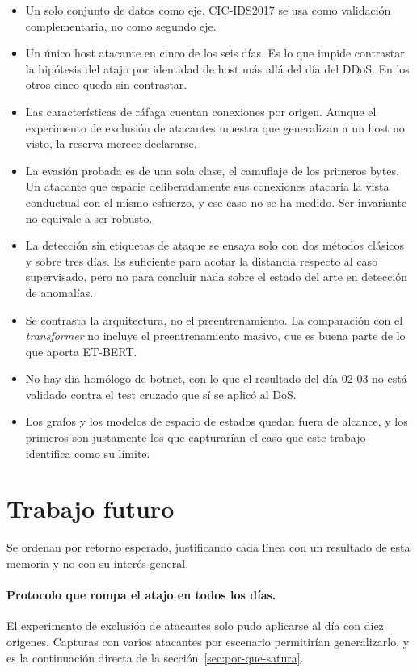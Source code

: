 \begin{itemize}
  \item Un solo conjunto de datos como eje. CIC-IDS2017 se usa como validación
        complementaria, no como segundo eje.
  \item Un único host atacante en cinco de los seis días. Es lo que impide
        contrastar la hipótesis del atajo por identidad de host más allá del día
        del DDoS. En los otros cinco queda sin contrastar.
  \item Las características de ráfaga cuentan conexiones por origen. Aunque el
        experimento de exclusión de atacantes muestra que generalizan a un host
        no visto, la reserva merece declararse.
  \item La evasión probada es de una sola clase, el camuflaje de los primeros
        bytes. Un atacante que espacie deliberadamente sus conexiones atacaría
        la vista conductual con el mismo esfuerzo, y ese caso no se ha medido.
        Ser invariante no equivale a ser robusto.
  \item La detección sin etiquetas de ataque se ensaya solo con dos métodos
        clásicos y sobre tres días. Es suficiente para acotar la distancia
        respecto al caso supervisado, pero no para concluir nada sobre el estado
        del arte en detección de anomalías.
  \item Se contrasta la arquitectura, no el preentrenamiento. La comparación con
        el \emph{transformer} no incluye el preentrenamiento masivo, que es
        buena parte de lo que aporta ET-BERT.
  \item No hay día homólogo de botnet, con lo que el resultado del día 02-03 no
        está validado contra el test cruzado que sí se aplicó al DoS.
  \item Los grafos y los modelos de espacio de estados quedan fuera de alcance,
        y los primeros son justamente los que capturarían el caso que este
        trabajo identifica como su límite.
\end{itemize}

\section{Trabajo futuro}
\label{sec:futuro}

Se ordenan por retorno esperado, justificando cada línea con un resultado de
esta memoria y no con su interés general.

\paragraph{Protocolo que rompa el atajo en todos los días.} El experimento de
exclusión de atacantes solo pudo aplicarse al día con diez orígenes. Capturas
con varios atacantes por escenario permitirían generalizarlo, y es la
continuación directa de la sección~\ref{sec:por-que-satura}.

